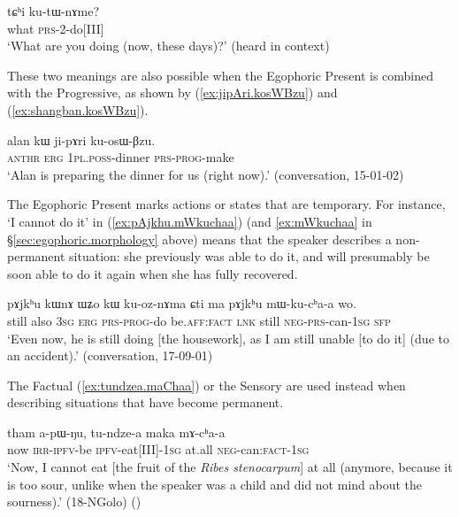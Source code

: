 \begin{exe}
\ex \label{ex:tChi.kutWnAme}
\gll tɕʰi ku-tɯ-nɤme? \\
what \textsc{prs}-2-do[III] \\
\glt `What are you doing (now, these days)?' (heard in context)
\end{exe}

These two meanings are also possible when the Egophoric Present is combined with the Progressive, as shown by (\ref{ex:jipAri.kosWBzu}) and (\ref{ex:shangban.kosWBzu}).

\begin{exe}
\ex \label{ex:jipAri.kosWBzu}
\gll alan kɯ ji-pɤri ku-osɯ-βzu. \\
\textsc{anthr} \textsc{erg} \textsc{1pl}.\textsc{poss}-dinner \textsc{prs}-\textsc{prog}-make \\
\glt `Alan is preparing the dinner for us (right now).' (conversation, 15-01-02)
\end{exe}

The Egophoric Present marks actions or states that are temporary. For instance,  `I cannot do it' in (\ref{ex:pAjkhu.mWkuchaa}) (and \ref{ex:mWkuchaa} in §\ref{sec:egophoric.morphology} above) means that the speaker describes a non-permanent situation: she previously was able to do it, and will presumably be soon able to do it again when she has fully recovered.

\begin{exe}
\ex \label{ex:pAjkhu.mWkuchaa}
\gll pɤjkʰu kɯnɤ ɯʑo kɯ ku-oz-nɤma ɕti ma pɤjkʰu mɯ-ku-cʰa-a wo. \\
still also \textsc{3sg} \textsc{erg} \textsc{prs}-\textsc{prog}-do be.\textsc{aff}:\textsc{fact} \textsc{lnk} still \textsc{neg}-\textsc{prs}-can-\textsc{1sg} \textsc{sfp} \\
\glt `Even now, he is still doing [the housework], as I am still unable [to do it] (due to an accident).' (conversation, 17-09-01)
\end{exe}

The Factual (\ref{ex:tundzea.maChaa}) or the Sensory are used instead when describing situations that have become permanent.

\begin{exe}
\ex \label{ex:tundzea.maChaa}
\gll  tham a-pɯ-ŋu, tu-ndze-a maka mɤ-cʰa-a \\
now \textsc{irr}-\textsc{ipfv}-be \textsc{ipfv}-eat[III]-\textsc{1sg} at.all \textsc{neg}-can:\textsc{fact}-\textsc{1sg} \\
\glt `Now, I cannot eat [the fruit of the \textit{Ribes stenocarpum}] at all (anymore, because it is too sour, unlike when the speaker was a child and did not mind about the sourness).' (18-NGolo)
()
\end{exe}


